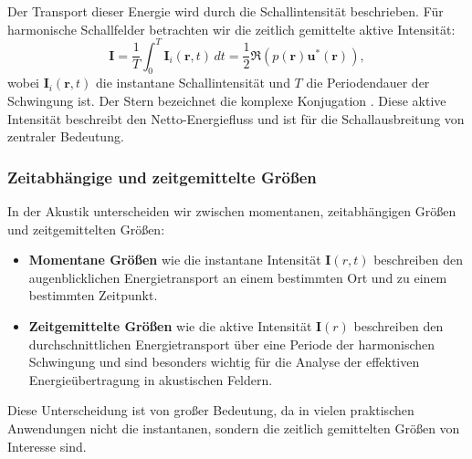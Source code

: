 Der Transport dieser Energie wird durch die Schallintensität
beschrieben.
Für harmonische Schallfelder betrachten wir die zeitlich
gemittelte aktive Intensität:
\begin{equation}
\boldsymbol{I}
=
\frac{1}{T}\int_0^T \boldsymbol{I}_i(\boldsymbol{r},t)\,dt
=
\frac{1}{2}\Re (p(\boldsymbol{r}) \boldsymbol{u}^*(\boldsymbol{r})),
\end{equation}
wobei $\boldsymbol{I}_i(\boldsymbol{r},t)$ die instantane Schallintensität und $T$ die Periodendauer der Schwingung ist. Der Stern bezeichnet die komplexe Konjugation .
Diese aktive Intensität beschreibt den Netto-Energiefluss und ist für die Schallausbreitung von zentraler Bedeutung.

\subsubsection{Zeitabhängige und zeitgemittelte Größen}

In der Akustik unterscheiden wir zwischen momentanen, zeitabhängigen Größen und zeitgemittelten Größen:

\begin{itemize}
\item \textbf{Momentane Größen} wie die instantane Intensität $\boldsymbol{I}(r,t)$ beschreiben den augenblicklichen Energietransport an einem bestimmten Ort und zu einem bestimmten Zeitpunkt.

\item \textbf{Zeitgemittelte Größen} wie die aktive Intensität $\boldsymbol{I}(r)$ beschreiben den durchschnittlichen Energietransport über eine Periode der harmonischen Schwingung und sind besonders wichtig für die Analyse der effektiven Energieübertragung in akustischen Feldern.
\end{itemize}

Diese Unterscheidung ist von großer Bedeutung, da in vielen praktischen Anwendungen nicht die instantanen, sondern die zeitlich gemittelten Größen von Interesse sind.




